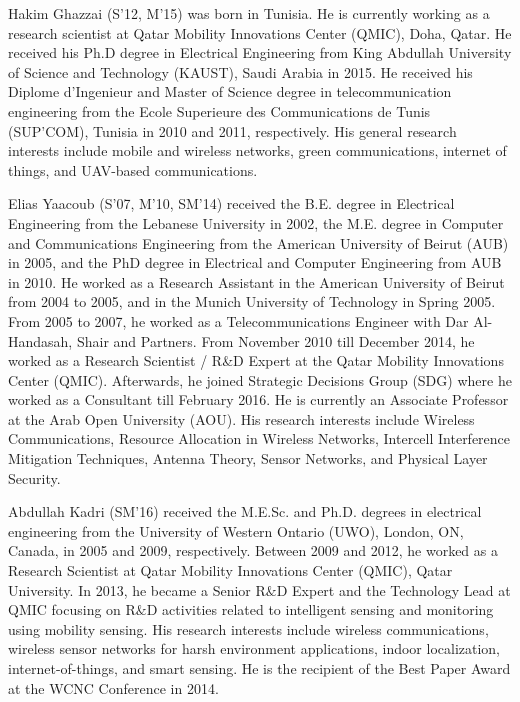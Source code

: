 \documentclass[10pt, letter, twocolumn]{IEEEtran}
\begin{document}
\begin{IEEEbiography}
    {Hakim Ghazzai} (S'12, M'15)
was born in Tunisia. He is currently working as a research scientist at Qatar Mobility Innovations Center (QMIC), Doha, Qatar. He received his Ph.D degree in Electrical Engineering from King Abdullah University of Science and Technology (KAUST), Saudi Arabia in 2015. He received his Diplome d'Ingenieur and Master of Science degree in telecommunication engineering from the Ecole Superieure des Communications de Tunis (SUP'COM), Tunisia in 2010 and 2011, respectively. His general research interests include mobile and wireless networks, green communications, internet of things, and UAV-based communications.
\end{IEEEbiography}

\begin{IEEEbiography}
    {Elias Yaacoub} (S'07, M'10, SM'14)
received the B.E. degree in Electrical Engineering from the Lebanese University in 2002, the M.E. degree in Computer and Communications Engineering from the American University of Beirut (AUB) in 2005, and the PhD degree in Electrical and Computer Engineering from AUB in 2010. He worked as a Research Assistant in the American University of Beirut from 2004 to 2005, and in the Munich University of Technology in Spring 2005. From 2005 to 2007, he worked as a Telecommunications Engineer with Dar Al-Handasah, Shair and Partners. From November 2010 till December 2014, he worked as a Research Scientist / R\&D Expert at the Qatar Mobility Innovations Center (QMIC). Afterwards, he joined Strategic Decisions Group (SDG) where he worked as a Consultant till February 2016. He is currently an Associate Professor at the Arab Open University (AOU). His research interests include Wireless Communications, Resource Allocation in Wireless Networks, Intercell Interference Mitigation Techniques, Antenna Theory, Sensor Networks, and Physical Layer Security.
\end{IEEEbiography}

\begin{IEEEbiography}
    {Abdullah Kadri} (SM'16) received the M.E.Sc. and Ph.D. degrees in electrical engineering from the University of Western Ontario (UWO), London, ON, Canada, in 2005 and 2009, respectively. Between 2009 and 2012, he worked as a Research Scientist at Qatar Mobility Innovations Center (QMIC), Qatar University. In 2013, he became a Senior R$\&$D Expert and the Technology Lead at QMIC focusing on R$\&$D activities related to intelligent sensing and monitoring using mobility sensing. His research interests include wireless communications, wireless sensor networks for harsh environment applications, indoor localization, internet-of-things, and smart sensing. He is the recipient of the Best Paper Award at the WCNC Conference in 2014.
\end{IEEEbiography}
\end{document}
